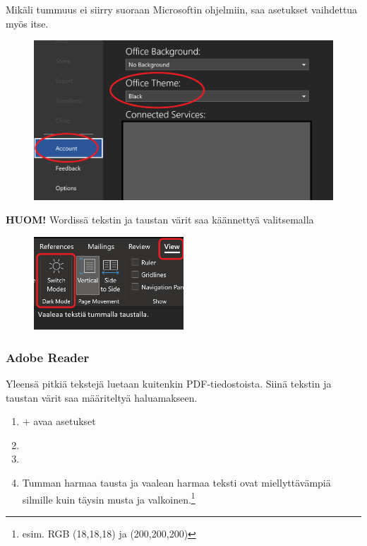 \documentclass[a4paper,12pt]{scrartcl}
\begin{document}
Mikäli tummuus ei siirry suoraan Microsoftin ohjelmiin, saa asetukset vaihdettua myös itse.



\begin{figure}[H]
	\includegraphics[width=\textwidth]{img/Dark_theme_word}
\end{figure}

\textbf{HUOM!} Wordissä tekstin ja taustan värit saa käännettyä valitsemalla 



\begin{figure}[H]
	\includegraphics[width=0.5\textwidth]{img/dark_word}
\end{figure}

\subsubsection{Adobe Reader}

Yleensä pitkiä tekstejä luetaan kuitenkin PDF-tiedostoista. Siinä tekstin ja taustan värit saa määriteltyä haluamakseen.

\begin{enumerate}
	\item {}+ avaa asetukset 
	\item {}
	\item {}
	\item Tumman harmaa tausta ja vaalean harmaa teksti ovat miellyttävämpiä silmille kuin täysin musta ja valkoinen.\footnote{esim. RGB (18,18,18) ja (200,200,200)}
\end{enumerate}
\end{document}
